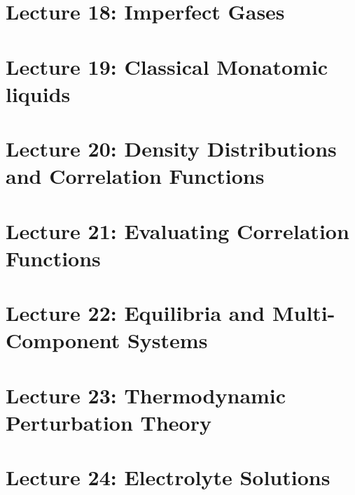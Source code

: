 \documentclass[reprint]{revtex4-1}
\numberwithin{equation}{section}
\begin{document}
\section{Lecture 18: Imperfect Gases}

\section{Lecture 19: Classical Monatomic liquids}

\section{Lecture 20: Density Distributions and Correlation Functions}

\section{Lecture 21: Evaluating Correlation Functions}

\section{Lecture 22: Equilibria and Multi-Component Systems}

\section{Lecture 23: Thermodynamic Perturbation Theory}

\section{Lecture 24: Electrolyte Solutions}
\end{document}
